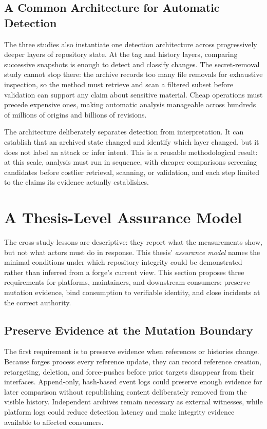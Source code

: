 \subsection{A Common Architecture for Automatic Detection}
\label{subsec:concl-contrib-synthesis}

The three studies also instantiate one detection architecture across progressively deeper layers of repository state.
At the tag and history layers, comparing successive snapshots is enough to detect and classify changes.
The secret-removal study cannot stop there: the archive records too many file removals for exhaustive inspection, so the method must retrieve and scan a filtered subset before validation can support any claim about sensitive material.
Cheap operations must precede expensive ones, making automatic analysis manageable across hundreds of millions of origins and billions of revisions.

The architecture deliberately separates detection from interpretation.
It can establish that an archived state changed and identify which layer changed, but it does not label an attack or infer intent.
This is a reusable methodological result: at this scale, analysis must run in sequence, with cheaper comparisons screening candidates before costlier retrieval, scanning, or validation, and each step limited to the claims its evidence actually establishes.

\section{A Thesis-Level Assurance Model}
\label{sec:concl-implications}

The cross-study lessons are descriptive: they report what the measurements show, but not what actors must do in response.
This thesis' \emph{assurance model} names the minimal conditions under which repository integrity could be demonstrated rather than inferred from a forge's current view.
This section proposes three requirements for platforms, maintainers, and downstream consumers: preserve mutation evidence, bind consumption to verifiable identity, and close incidents at the correct authority.

\subsection{Preserve Evidence at the Mutation Boundary}
\label{subsec:concl-impl-platforms}

The first requirement is to preserve evidence when references or histories change.
Because forges process every reference update, they can record reference creation, retargeting, deletion, and force-pushes before prior targets disappear from their interfaces.
Append-only, hash-based event logs could preserve enough evidence for later comparison without republishing content deliberately removed from the visible history.
Independent archives remain necessary as external witnesses, while platform logs could reduce detection latency and make integrity evidence available to affected consumers.

